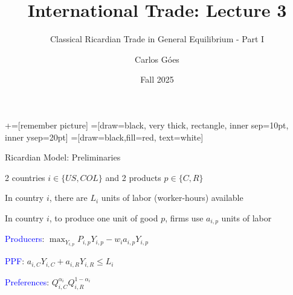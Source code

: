 \documentclass[notes,11pt, aspectratio=169, xcolor=table]{beamer}
\title[]{International Trade: Lecture 3}
\subtitle[]{Classical Ricardian Trade in General Equilibrium - Part I}
\author[Góes]
{Carlos Góes\inst{1}}
\date{Fall 2025}
\institute[GWU]{\inst{1} George Washington University }
\newcommand{\blue}[1]{\textcolor{blue}{#1}}
\newenvironment{wideitemize}{\itemize\addtolength{\itemsep}{10pt}}{\enditemize}
\begin{document}
\newcommand\marktopleft[1]{%
    \tikz[overlay,remember picture] 
        \node (marker-#1-a) at (-.3em,.3em) {};%
}
\newcommand\markbottomright[2]{%
    \tikz[overlay,remember picture] 
        \node (marker-#1-b) at (0em,0em) {};%
}
+=[remember picture] 
 =[draw=black, very thick, rectangle, inner sep=10pt, inner ysep=20pt]
 =[draw=black,fill=red, text=white]















\frame{\titlepage}
\addtocounter{framenumber}{-1}





\begin{frame}{Ricardian Model: Preliminaries}
\begin{wideitemize}
        \item 2  countries $i \in \{ US, COL\}$ and 2 products $p \in \{ C, R\}$
        \item In country $i$, there are $L_i$ units of labor (worker-hours) available 
        \item In country $i$, to produce one unit of good $p$, firms use $a_{i,p}$ units of labor
        \item \blue{Producers}: $\max_{Y_{i,p}} P_{i,p} Y_{i,p} - w_i a_{i,p} Y_{i,p}$ 
        \item \blue{PPF}: $a_{i,C} Y_{i,C} + a_{i,R} Y_{i,R} \le L_i$ 
        \item \blue{Preferences}: $Q_{i,C}^{\alpha_i} Q_{i,R}^{1-\alpha_i}$ 
        \end{wideitemize}
\end{frame}
\end{document}
